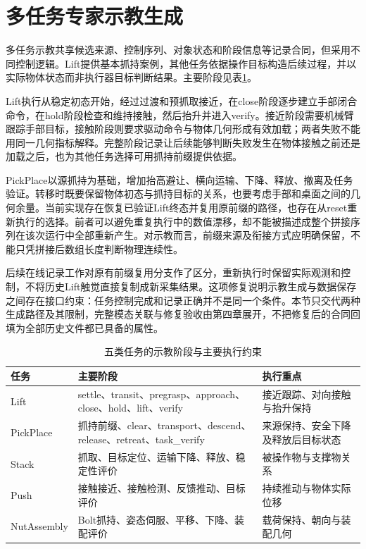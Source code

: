 \section{多任务专家示教生成}
\label{sec:multitask_demonstration}

多任务示教共享候选来源、控制序列、对象状态和阶段信息等记录合同，但采用不同控制逻辑。Lift提供基本抓持案例，其他任务依据操作目标构造后续过程，并以实际物体状态而非执行器目标判断结果。主要阶段见表\ref{tab:ch03_task_stages}。

Lift执行从稳定初态开始，经过过渡和预抓取接近，在close阶段逐步建立手部闭合命令，在hold阶段检查和维持接触，然后抬升并进入verify。接近阶段需要机械臂跟踪手部目标，接触阶段则要求驱动命令与物体几何形成有效加载；两者失败不能用同一几何指标解释。完整阶段记录让后续能够判断失败发生在物体接触之前还是加载之后，也为其他任务选择可用抓持前缀提供依据。

PickPlace以源抓持为基础，增加抬高避让、横向运输、下降、释放、撤离及任务验证。转移时既要保留物体初态与抓持目标的关系，也要考虑手部和桌面之间的几何余量。当前实现存在恢复已验证Lift终态并复用原前缀的路径，也存在从reset重新执行的选择。前者可以避免重复执行中的数值漂移，却不能被描述成整个拼接序列在该次运行中全部重新产生。对示教而言，前缀来源及衔接方式应明确保留，不能只凭拼接后数组长度判断物理连续性。

后续在线记录工作对原有前缀复用分支作了区分，重新执行时保留实际观测和控制，不将历史Lift触觉直接复制成新采集结果。这项修复说明示教生成与数据保存之间存在接口约束：任务控制完成和记录正确并不是同一个条件。本节只交代两种生成路径及其限制，完整模态关联与修复验收由第四章展开，不把修复后的合同回填为全部历史文件都已具备的属性。

\begin{table}[htbp]
 \centering\small
 \caption{五类任务的示教阶段与主要执行约束}
 \label{tab:ch03_task_stages}
 \begin{tabular}{p{}p{}p{}}
 \hline
 任务 & 主要阶段 & 执行重点\\
 \hline
 Lift & settle、transit、pregrasp、approach、close、hold、lift、verify & 接近跟踪、对向接触与抬升保持\\
 PickPlace & 抓持前缀、clear、transport、descend、release、retreat、task\_verify & 来源保持、安全下降及释放后目标状态\\
 Stack & 抓取、目标定位、运输下降、释放、稳定性评价 & 被操作物与支撑物关系\\
 Push & 接触接近、接触检测、反馈推动、目标评价 & 持续推动与物体实际位移\\
 NutAssembly & Bolt抓持、姿态伺服、平移、下降、装配评价 & 载荷保持、朝向与装配几何\\
 \hline
 \end{tabular}
\end{table}

